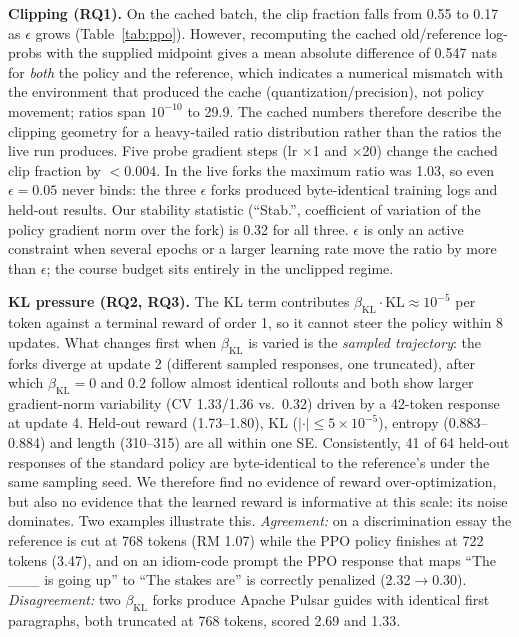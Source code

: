 \documentclass{article}
\begin{document}
\textbf{Clipping (RQ1).} On the cached batch, the clip fraction falls from 0.55 to 0.17 as $\epsilon$ grows (Table~\ref{tab:ppo}). However, recomputing the cached old/reference log-probs with the supplied midpoint gives a mean absolute difference of 0.547 nats for \emph{both} the policy and the reference, which indicates a numerical mismatch with the environment that produced the cache (quantization/precision), not policy movement; ratios span $10^{-10}$ to 29.9. The cached numbers therefore describe the clipping geometry for a heavy-tailed ratio distribution rather than the ratios the live run produces. Five probe gradient steps (lr $\times$1 and $\times$20) change the cached clip fraction by $<0.004$. In the live forks the maximum ratio was 1.03, so even $\epsilon{=}0.05$ never binds: the three $\epsilon$ forks produced byte-identical training logs and held-out results. Our stability statistic (``Stab.'', coefficient of variation of the policy gradient norm over the fork) is 0.32 for all three. $\epsilon$ is only an active constraint when several epochs or a larger learning rate move the ratio by more than $\epsilon$; the course budget sits entirely in the unclipped regime.

\textbf{KL pressure (RQ2, RQ3).} The KL term contributes $\beta_{\text{KL}}\cdot\text{KL}\approx10^{-5}$ per token against a terminal reward of order 1, so it cannot steer the policy within 8 updates. What changes first when $\beta_{\text{KL}}$ is varied is the \emph{sampled trajectory}: the forks diverge at update 2 (different sampled responses, one truncated), after which $\beta_{\text{KL}}{=}0$ and $0.2$ follow almost identical rollouts and both show larger gradient-norm variability (CV 1.33/1.36 vs.\ 0.32) driven by a 42-token response at update 4. Held-out reward (1.73--1.80), KL ($|\cdot|\le5{\times}10^{-5}$), entropy (0.883--0.884) and length (310--315) are all within one SE. Consistently, 41 of 64 held-out responses of the standard policy are byte-identical to the reference's under the same sampling seed. We therefore find no evidence of reward over-optimization, but also no evidence that the learned reward is informative at this scale: its noise dominates. Two examples illustrate this. \emph{Agreement:} on a discrimination essay the reference is cut at 768 tokens (RM 1.07) while the PPO policy finishes at 722 tokens (3.47), and on an idiom-code prompt the PPO response that maps ``The \_\_\_ is going up'' to ``The stakes are'' is correctly penalized (2.32$\to$0.30). \emph{Disagreement:} two $\beta_{\text{KL}}$ forks produce Apache Pulsar guides with identical first paragraphs, both truncated at 768 tokens, scored 2.69 and 1.33.
\end{document}
